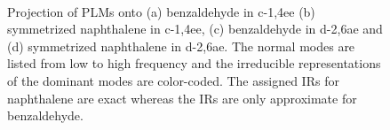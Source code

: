 \begin{figure}[ht]
 \\
\caption{Projection of PLMs onto (a) benzaldehyde in c-1,4ee (b) symmetrized naphthalene in c-1,4ee, (c) benzaldehyde in d-2,6ae and (d) symmetrized naphthalene in d-2,6ae.
The normal modes are listed from low to high frequency and the irreducible representations of the dominant modes are color-coded. The assigned IRs for naphthalene are exact
 whereas the IRs are only approximate for benzaldehyde. \label{fragProj}}
\end{figure}


